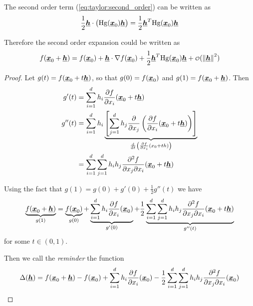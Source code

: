 \documentclass[12pt]{extarticle}
\renewcommand{\vec}[1]{\uvec{#1}}
\newcommand{\Hg}{{\operatorfont Hg}}
\begin{document}
\begin{remark}
    The second order term (\autoref{eq:taylor:second_order}) can be written as
    \begin{equation}
        \frac{1}{2} \vec{h} \cdot \left( \Hg (\vec x_0) \vec h\right) = \frac{1}{2} \vec h^T \Hg(\vec x_0) \vec h
    \end{equation}

    Therefore the second order expansion could be written  as
    \begin{equation}
        f(\vec x_0 + \vec h) = f(\vec x_0) + \vec h \cdot \nabla f(\vec x_0) + \frac{1}{2} \vec h^T \Hg(\vec x_0) \vec h + \o(\norm{\vec h}^2)
    \end{equation}
\end{remark}

\begin{proof}
    Let $g(t) = f(\vec x_0 + t \vec h)$, so that $g(0) = f(\vec x_0)$ and $g(1) = f(\vec x_0 + \vec h)$.
    Then
    \begin{align}
        g'(t)  & = \sum^d_{i = 1} h_i \pdv{f}{x_i}\/(\vec x_0 + t \vec h)                                                                                                                         \\
        g''(t) & = \sum^d_{i = 1} h_i \underbrace{\left[ \sum^d_{j = 1} h_j \pdv{x_j}\left( \pdv{f}{x_i}\/(\vec x_0 + t\vec h) \right) \right]}_{\dv{t}\left( \pdv{f}{x_i} \/(x_0 + t h) \right)} \\
               & = \sum^d_{i = 1} \sum^d_{j = 1} h_i h_j \pdv[2]{f}{x_j}{x_i}\/(\vec x_0 + t \vec h)
    \end{align}

    Using the fact that $g(1) = g(0) + g'(0) + \frac{1}{2} g''(t)$ we have
    \begin{equation}
        \underbrace{f(\vec x_0 + \vec h)}_{g(1)} = \underbrace{f(\vec x_0)}_{g(0)} + \underbrace{\sum^d_{i = 1} h_i \pdv{f}{x_i}\/(\vec x_0)}_{g'(0)} + \frac{1}{2} \underbrace{\sum^d_{i = 1} \sum^d_{j = 1} h_i h_j \pdv[2]{f}{x_j}{x_i}\/(\vec x_0 + t \vec h)}_{g''(t)}
    \end{equation}
    for some $t \in (0, 1)$.

    Then we call the \textit{reminder} the function
    \begin{equation}
        \Delta(\vec h) = f(\vec x_0 + \vec h) - f(\vec x_0) + \sum^d_{i = 1} h_i \pdv{f}{x_i}\/(\vec x_0) - \frac{1}{2} \sum^d_{i = 1} \sum^d_{j = 1} h_i h_j \pdv[2]{f}{x_j}{x_i}\/(\vec x_0)
    \end{equation}


\end{proof}
\end{document}
